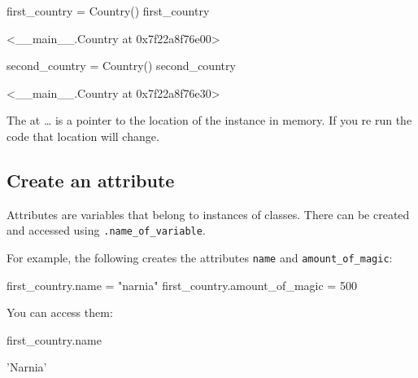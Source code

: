 \begin{pyin}
first_country = Country()
first_country
\end{pyin}





\begin{pyin}
<__main__.Country at 0x7f22a8f76e00>
\end{pyin}









\begin{pyin}
second_country = Country()
second_country
\end{pyin}





\begin{pyin}
<__main__.Country at 0x7f22a8f76e30>
\end{pyin}


The at … is a pointer to the location of the instance in memory. If you re run
the code that location will change.


\subsection{Create an attribute}

Attributes are variables that belong to instances of classes. There can be
created and accessed using \texttt{.name\_of\_variable}.


For example, the following creates the attributes \texttt{name} and
\texttt{amount\_of\_magic}:




\begin{pyin}
first_country.name = "narnia"
first_country.amount_of_magic = 500
\end{pyin}





You can access them:




\begin{pyin}
first_country.name
\end{pyin}





\begin{raw}
'Narnia'
\end{raw}







